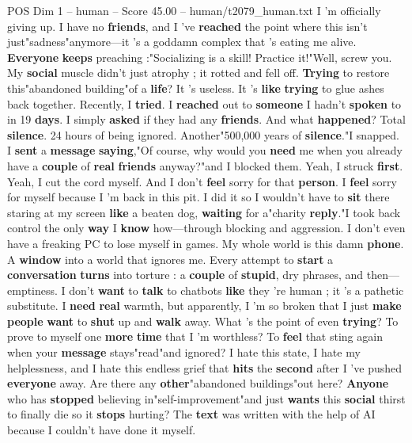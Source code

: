 \begin{textsample}{POS Dim 1 – human – Score 45.00 – human/t2079\_human.txt}  \label{ex:f1_pos_035}
I ’m officially giving up.
I have no \textbf{friends}, and I ’ve \textbf{reached} the point where this isn't just"sadness"anymore—it ’s a goddamn complex that ’s eating me alive. \textbf{Everyone} \textbf{keeps} preaching :"Socializing is a skill!
Practice it!"Well, screw you.
My \textbf{social} muscle didn't just atrophy ; it rotted and fell off. \textbf{Trying} to restore this"abandoned building"of a \textbf{life}?
It ’s useless.
It ’s \textbf{like} \textbf{trying} to glue ashes back together.
Recently, I \textbf{tried}.
I \textbf{reached} out to \textbf{someone} I hadn't \textbf{spoken} to in 19 \textbf{days}.
I simply \textbf{asked} if they had any \textbf{friends}.
And what \textbf{happened}?
Total \textbf{silence}. 24 hours of being ignored.
Another"500,000 years of \textbf{silence}."I snapped.
I \textbf{sent} a \textbf{message} \textbf{saying},"Of course, why would you \textbf{need} me when you already have a \textbf{couple} of \textbf{real} \textbf{friends} anyway?"and I blocked them.
Yeah, I struck \textbf{first}.
Yeah, I cut the cord myself.
And I don't \textbf{feel} sorry for that \textbf{person}.
I \textbf{feel} sorry for myself because I ’m back in this pit.
I did it so I wouldn't have to \textbf{sit} there staring at my screen \textbf{like} a beaten dog, \textbf{waiting} for a"charity \textbf{reply}."I took back control the only \textbf{way} I \textbf{know} how—through blocking and aggression.
I don't even have a freaking PC to lose myself in games.
My whole world is this damn \textbf{phone}.
A \textbf{window} into a world that ignores me.
Every attempt to \textbf{start} a \textbf{conversation} \textbf{turns} into torture : a \textbf{couple} of \textbf{stupid}, dry phrases, and then—emptiness.
I don't \textbf{want} to \textbf{talk} to chatbots \textbf{like} they ’re human ; it ’s a pathetic substitute.
I \textbf{need} \textbf{real} warmth, but apparently, I ’m so broken that I just \textbf{make} \textbf{people} \textbf{want} to \textbf{shut} up and \textbf{walk} away.
What ’s the point of even \textbf{trying}?
To prove to myself one \textbf{more} \textbf{time} that I ’m worthless?
To \textbf{feel} that sting again when your \textbf{message} stays"read"and ignored?
I hate this state, I hate my helplessness, and I hate this endless grief that \textbf{hits} the \textbf{second} after I ’ve pushed \textbf{everyone} away.
Are there any \textbf{other}"abandoned buildings"out here? \textbf{Anyone} who has \textbf{stopped} believing in"self-improvement"and just \textbf{wants} this \textbf{social} thirst to finally die so it \textbf{stops} hurting?
The \textbf{text} was written with the help of AI because I couldn't have done it myself.

\end{textsample}

